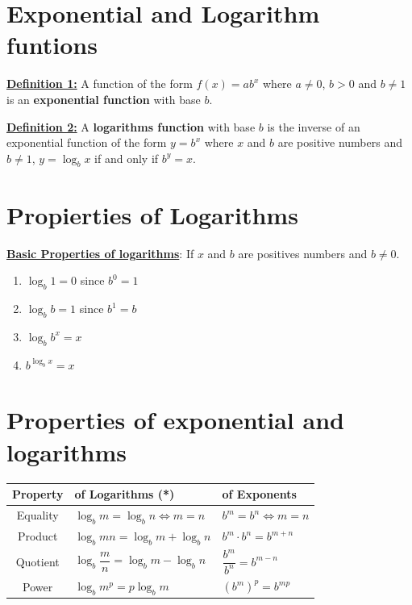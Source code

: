 \section{Exponential and Logarithm funtions}

\underline{\textbf{Definition 1:}} A function of the form $f(x) = ab^x$ where $a \neq 0$, $b > 0$ and $b \neq 1$ is an \textbf{exponential function} with base $b$.

\underline{\textbf{Definition 2:}} A \textbf{logarithms function} with base $b$ is the inverse of an exponential function of the form $y = b^x$ where $x$ and $b$ are positive numbers and $b \neq 1$, $y = \log_b x$ if and only if $b^y = x$.

\section{Propierties of Logarithms}

\underline{\textbf{Basic Properties of logarithms}}:
If $x$ and $b$ are positives numbers and $b \neq 0$.
\begin{multicols}{2}
    \begin{enumerate}
        \item $\log_b 1 = 0$ since $b^0 = 1$
        \item $\log_b b = 1$ since $b^1 = b$
        \item $\log_b b^x = x$
        \item $b^{\log_b x} = x$
    \end{enumerate}
\end{multicols}


\section{Properties of exponential and logarithms}
\renewcommand{\arraystretch}{2.5}
\begin{table}[H]
    \centering
    \begin{tabular}{|c |l |l|}
        \hline
        Property & of Logarithms (*) & of Exponents \\
        \hline \hline
        Equality & $\log_b m           = \log_b n \iff m = n$ & $b^m = b^n \iff m = n$\\\hline
        Product  & $\log_b mn          = \log_b m + \log_b n$ & $b^m \cdot b^n = b^{m + n}$\\\hline
        Quotient & $\log_b \dfrac{m}{n} = \log_b m - \log_b n$ & $\dfrac{b^m}{b^n} = b^{m - n}$\\\hline
        Power    & $\log_b m^p         = p\log_b m$ & $(b^m)^p = b^{mp}$\\\hline
    \end{tabular}
    \label{tab:table}
\end{table}

